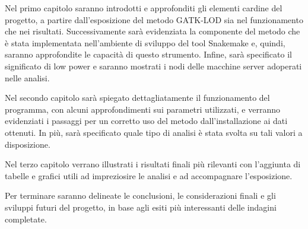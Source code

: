 \documentclass[12pt, a4paper]{report}
\begin{document}
Nel primo capitolo saranno introdotti e approfonditi gli elementi cardine del progetto, a partire dall'esposizione del metodo GATK-LOD sia nel funzionamento che nei risultati.
Successivamente sarà evidenziata la componente del metodo che è stata implementata nell'ambiente di sviluppo del tool Snakemake e, quindi, saranno approfondite le capacità di questo strumento.
Infine, sarà specificato il significato di low power e saranno mostrati i nodi delle macchine server adoperati nelle analisi.

Nel secondo capitolo sarà spiegato dettagliatamente il funzionamento del programma, con alcuni approfondimenti sui parametri utilizzati, e verranno evidenziati i passaggi per un corretto uso del metodo dall'installazione ai dati ottenuti.
In più, sarà specificato quale tipo di analisi è stata svolta su tali valori a disposizione.

Nel terzo capitolo verrano illustrati i risultati finali più rilevanti con l'aggiunta di tabelle e grafici utili ad impreziosire le analisi e ad accompagnare l'esposizione.

Per terminare saranno delineate le conclusioni, le considerazioni finali e gli sviluppi futuri del progetto, in base agli esiti più interessanti delle indagini completate.

\tableofcontents







\end{document}
